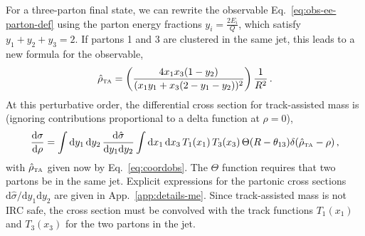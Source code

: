 \documentclass[letterpaper,11pt]{article}
\newcommand{\App}[1]{App.~\ref{#1}}
\newcommand{\Eq}[1]{Eq.~\eqref{#1}}
\begin{document}
For a three-parton final state, we can rewrite the observable \Eq{eq:obs-ee-parton-def} using the parton energy fractions $y_i = \frac{2E_i}{Q}$, which satisfy $y_1+y_2+y_3 = 2$.
%
If partons 1 and 3 are clustered in the same jet, this leads to a new formula for the observable,
\begin{equation}\label{eq:coordobs}
\hat{\rho}_{\mbox{\tiny TA}} = \left(\frac{4x_1x_3(1-y_2)}{(x_1 y_1 + x_3 (2-y_1-y_2))^2}\right) \frac{1}{R^2}\,.
\end{equation}
At this perturbative order, the differential cross section for track-assisted mass is (ignoring contributions proportional to a delta function at $\rho=0$),
\begin{equation}
\label{eq:fixed-order-cross-section}
\frac{\text{d}\sigma}{\text{d}\rho} = \int \text{d}y_1\, \text{d}y_2\, \frac{\text{d}\hat{\sigma}}{\text{d}y_1\text{d}y_2} \int \text{d}x_1\, \text{d}x_3\, T_1(x_1)\,T_3(x_3)\, \Theta (R-\theta_{13})\delta(\hat{\rho}_{\mbox{\tiny TA}}-\rho)\,,
\end{equation}
with $\hat{\rho}_{\mbox{\tiny TA}}$ given now by \Eq{eq:coordobs}. 
%
The $\Theta$ function requires that two partons be in the same jet. 
%
Explicit expressions for the partonic cross sections $\text{d}\hat{\sigma}/\text{d}y_1\text{d}y_2$ are given in \App{app:details-me}. 
%
Since track-assisted mass is not IRC safe, the cross section must be convolved with the track functions $T_1(x_1)$ and $T_3(x_3)$ for the two partons in the jet. 








\end{document}
